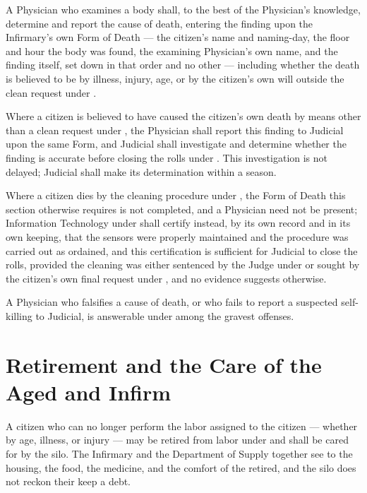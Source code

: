 \begin{clauses}
\item A Physician who examines a body shall, to the best of the Physician's knowledge, determine and report the cause of death, entering the finding upon the Infirmary's own Form of Death --- the citizen's name and naming-day, the floor and hour the body was found, the examining Physician's own name, and the finding itself, set down in that order and no other --- including whether the death is believed to be by illness, injury, age, or by the citizen's own will outside the clean request under .
\item Where a citizen is believed to have caused the citizen's own death by means other than a clean request under , the Physician shall report this finding to Judicial upon the same Form, and Judicial shall investigate and determine whether the finding is accurate before closing the rolls under . This investigation is not delayed; Judicial shall make its determination within a season.
\item Where a citizen dies by the cleaning procedure under , the Form of Death this section otherwise requires is not completed, and a Physician need not be present; Information Technology under  shall certify instead, by its own record and in its own keeping, that the sensors were properly maintained and the procedure was carried out as ordained, and this certification is sufficient for Judicial to close the rolls, provided the cleaning was either sentenced by the Judge under  or sought by the citizen's own final request under , and no evidence suggests otherwise.
\item A Physician who falsifies a cause of death, or who fails to report a suspected self-killing to Judicial, is answerable under  among the gravest offenses.
\end{clauses}

\section{Retirement and the Care of the Aged and Infirm}
\label{sec:health:retirement-and-the-care-of-the-aged-and-infirm}

A citizen who can no longer perform the labor assigned to the citizen --- whether by age, illness, or injury --- may be retired from labor under  and shall be cared for by the silo. The Infirmary and the Department of Supply together see to the housing, the food, the medicine, and the comfort of the retired, and the silo does not reckon their keep a debt.

